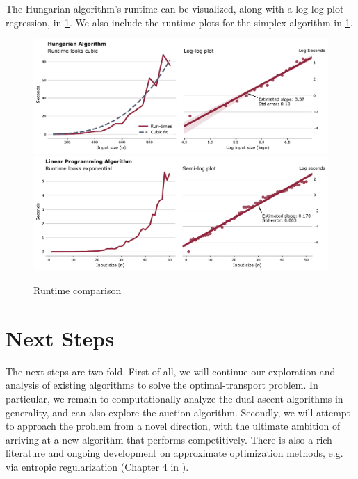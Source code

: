 \documentclass[11pt,reqno]{amsart}
\renewcommand{\b}{\mathbf}
\newcommand{\one}{\mathbbm{1}}
\theoremstyle{definition}
\theoremstyle{remark}
\begin{document}
The Hungarian algorithm's runtime can be visualized, along with a log-log plot
regression, in \cref{fig:hungarianruntime}. We also include the runtime plots for the simplex algorithm in \cref{fig:hungarianruntime}.

\begin{figure}[h]
\includegraphics[width=\textwidth]{../../code/hungarianruntime}
\includegraphics[width=\textwidth]{../../code/lpruntime}
\caption{Runtime comparison}
\label{fig:hungarianruntime}
\end{figure}



\section{Next Steps}

The next steps are two-fold. First of all, we will continue our exploration and
analysis of existing algorithms to solve the optimal-transport problem. In
particular, we remain to computationally analyze the dual-ascent algorithms in
generality, and can also explore the auction algorithm. Secondly, we will
attempt to approach the problem from a novel direction, with the ultimate
ambition of arriving at a new algorithm that performs competitively. There is also a rich literature and ongoing development on approximate optimization methods, e.g. via entropic regularization (Chapter 4 in \cite{peyre2017computational}).  

 



\end{document}
